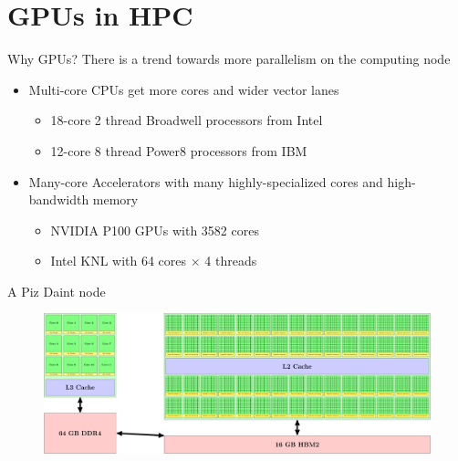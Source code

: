 \documentclass[aspectratio=169,12pt]{beamer}
\begin{document}
\part{GPUs in HPC}

\begin{frame}{Why GPUs?}
  There is a trend towards more parallelism on the computing node
  \vfill
  \begin{itemize}
    \item Multi-core CPUs get more cores and wider vector lanes
      \begin{itemize}
      \item 18-core 2 thread Broadwell processors from Intel
      \item 12-core 8 thread Power8 processors from IBM
      \end{itemize}
      \vfill
    \item Many-core Accelerators with many highly-specialized cores and high-bandwidth memory
      \begin{itemize}
      \item NVIDIA P100 GPUs with 3582 cores
      \item Intel KNL with 64 cores $\times$ 4 threads
      \end{itemize}
  \end{itemize}
\end{frame}

\begin{frame}{A Piz Daint node}
  \begin{figure}
    \centering
    \includegraphics[width=\textwidth]{pizdaint_node}
  \end{figure}
\end{frame}
\end{document}
